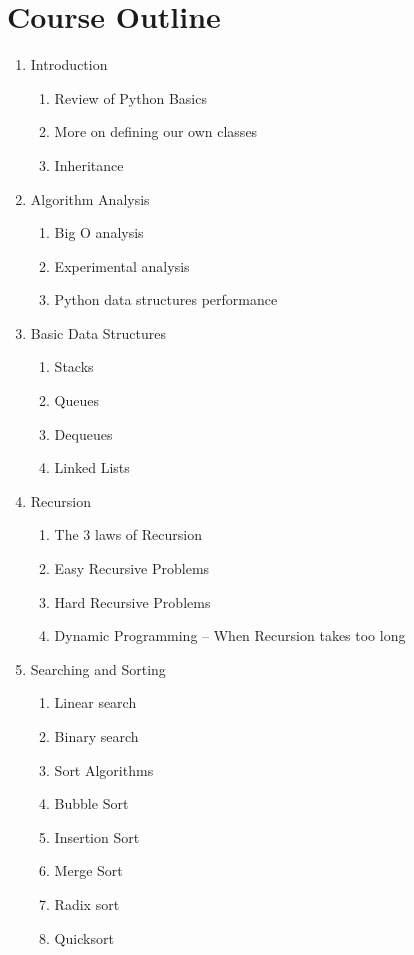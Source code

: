 \documentclass[11pt,twocolumn]{article}
\begin{document}
\section*{Course Outline}
\begin{enumerate}
    \item Introduction

\begin{enumerate}
    \item Review of Python Basics
    \item More on defining our own classes
    \item Inheritance
\end{enumerate}
    \item Algorithm Analysis

\begin{enumerate}
    \item Big O analysis
    \item Experimental analysis
    \item Python data structures performance

\end{enumerate}
    \item Basic Data Structures

\begin{enumerate}
    \item Stacks
    \item Queues
    \item Dequeues
    \item Linked Lists

\end{enumerate}
    \item Recursion

\begin{enumerate}
    \item The 3 laws of Recursion
    \item Easy Recursive Problems
    \item Hard Recursive Problems
    \item Dynamic Programming -- When Recursion takes too long

\end{enumerate}
    \item Searching and Sorting

\begin{enumerate}
    \item Linear search
    \item Binary search
    \item Sort Algorithms
    \item Bubble Sort
    \item Insertion Sort
    \item Merge Sort
    \item Radix sort
    \item Quicksort


\end{enumerate}
\end{enumerate}
\end{document}
